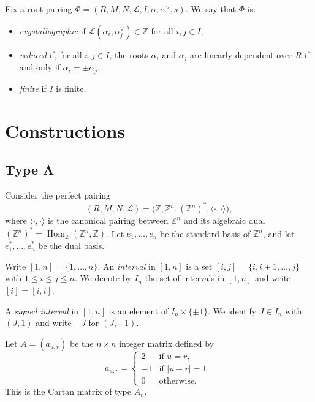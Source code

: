 \begin{definition}\label{def:root_pairing_properties}
\leanok
Fix a root pairing $\Phi=(R,M,N,\mathcal{L},I,\alpha,\alpha^\vee,s)$.
We say that $\Phi$ is:
\begin{itemize}
    \item \emph{crystallographic} if
    $\mathcal{L}(\alpha_i,\alpha_j^\vee)\in \mathbb{Z}$ for all $i,j\in I$,
    \item \emph{reduced} if, for all $i,j\in I$, the roots $\alpha_i$ and
    $\alpha_j$ are linearly dependent over $R$ if and only if
    $\alpha_i=\pm\alpha_j$,
    \item \emph{finite} if $I$ is finite.
\end{itemize}
\end{definition}


\chapter{Constructions}\label{chapter:constructions}

\section{Type A}

Consider the perfect pairing
\[
    (R,M,N,\mathcal{L})
    =
    \bigl(\mathbb{Z},\mathbb{Z}^n,(\mathbb{Z}^n)^*,
    \langle\cdot,\cdot\rangle\bigr),
\]
where $\langle\cdot,\cdot\rangle$ is the canonical pairing between
$\mathbb{Z}^n$ and its algebraic dual
$(\mathbb{Z}^n)^*=\operatorname{Hom}_{\mathbb{Z}}(\mathbb{Z}^n,\mathbb{Z})$.
Let $e_1,\ldots,e_n$ be the standard basis of $\mathbb{Z}^n$, and let
$e_1^*,\ldots,e_n^*$ be the dual basis.

Write $[1,n]=\{1,\ldots,n\}$. An \emph{interval} in $[1,n]$ is a set
$[i,j]=\{i,i+1,\ldots,j\}$ with $1\le i\le j\le n$. We denote by $I_n$
the set of intervals in $[1,n]$ and write $[i]=[i,i]$.

A \emph{signed interval} in $[1,n]$ is an element of
$I_n\times\{\pm1\}$. We identify $J\in I_n$ with $(J,1)$ and write
$-J$ for $(J,-1)$.

Let $A=(a_{u,r})$ be the $n\times n$ integer matrix defined by
\[
    a_{u,r}=
    \begin{cases}
        2 & \text{if }u=r,\\
        -1 & \text{if }|u-r|=1,\\
        0 & \text{otherwise.}
    \end{cases}
\]
This is the Cartan matrix of type $A_n$.

